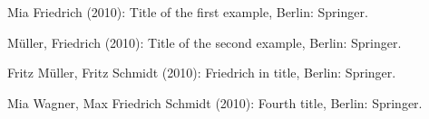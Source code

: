 Mia Friedrich (2010): Title of the first example, Berlin: Springer.

M\"{u}ller, Friedrich (2010): Title of the second example, Berlin: Springer.

Fritz M\"{u}ller, Fritz Schmidt (2010): Friedrich in title, Berlin: Springer.

Mia Wagner, Max Friedrich Schmidt (2010): Fourth title, Berlin: Springer.
